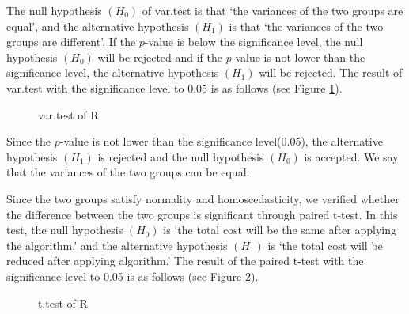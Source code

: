 The null hypothesis $(H_{0})$ of var.test is that `the variances of the two groups are equal', and the alternative hypothesis $(H_{1})$ is that `the variances of the two groups are different'. 
If the $p$-value is below the significance level, the null hypothesis $(H_{0})$ will be rejected and if the $p$-value is not lower than the significance level, the alternative hypothesis $(H_{1})$ will be rejected.  The result of var.test with the significance level to 0.05 is as follows (see Figure \ref{fig:vartest}).

\begin{figure}[h!]
	\centering
	\caption{var.test of R}
	\label{fig:vartest}       %
\end{figure}

Since the $p$-value is not lower than the significance level(0.05), the alternative hypothesis $(H_{1})$ is rejected and the null hypothesis $(H_{0})$ is accepted. 
We say that the variances of the two groups can be equal.

Since the two groups satisfy normality and homoscedasticity, we verified whether the difference between the two groups is significant through paired t-test. In this test, the null hypothesis $(H_{0})$ is `the total cost will be the same after applying the algorithm.' and the alternative hypothesis $(H_{1})$ is `the total cost will be reduced after applying algorithm.' The result of the paired t-test with the significance level to 0.05 is as follows (see Figure \ref{fig:ttest}).

\begin{figure}[h!]
	\centering
	\caption{t.test of R}
	\label{fig:ttest}       %
\end{figure}

